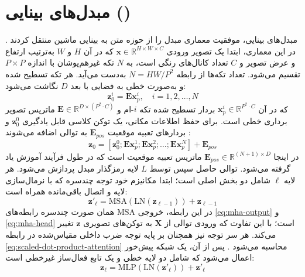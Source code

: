 \section[مبدل‌های بینایی]{مبدل‌های بینایی ()}
\label{sec:ch1-vit}
مبدل‌های بینایی، موفقیت معماری مبدل را از حوزه متن به بینایی ماشین منتقل کردند \cite{Dosovitskiy2020}.
در این معماری، ابتدا یک تصویر ورودی $\mathbf{x} \in \mathbb{R}^{H \times W \times C}$ که در آن $H$ و $W$ به‌ترتیب ارتفاع و عرض تصویر و $C$ تعداد کانال‌های رنگی است، به $N$ تکه غیرهم‌پوشان با اندازه $P \times P$ تقسیم می‌شود. تعداد تکه‌ها از رابطه $N = HW/P^2$ به‌دست می‌آید. هر تکه تسطیح شده و به‌صورت خطی به فضایی با بعد $D$ نگاشت می‌شود:
\begin{equation}
    \mathbf{z}_0^i = \mathbf{E} \mathbf{x}_p^i, \quad i = 1, 2, \dots, N
\end{equation}
که در آن $\mathbf{x}_p^i \in \mathbb{R}^{P^2 \cdot C}$ بردار تسطیح شده تکه $i$-ام و $\mathbf{E} \in \mathbb{R}^{D \times (P^2 \cdot C)}$ ماتریس تصویر برداری خطی است. برای حفظ اطلاعات مکانی، یک توکن کلاسی قابل یادگیری $\mathbf{z}_0^0$ و بردارهای تعبیه موقعیت $\mathbf{E}_{pos}$ به توالی اضافه می‌شوند \cite{Dosovitskiy2020}:
\begin{equation}
    \mathbf{z}_0 = [\mathbf{z}_0^0; \mathbf{E}\mathbf{x}_p^1; \mathbf{E}\mathbf{x}_p^2; \dots; \mathbf{E}\mathbf{x}_p^N] + \mathbf{E}_{pos}
\end{equation}
در اینجا $\mathbf{E}_{pos} \in \mathbb{R}^{(N+1) \times D}$ ماتریس تعبیه موقعیت است که در طول فرآیند آموزش یاد گرفته می‌شود. توالی حاصل سپس توسط $L$ لایه رمزگذار مبدل پردازش می‌شود. هر لایه $\ell$ شامل دو بخش اصلی است؛ ابتدا مکانیزم خود توجه چندسره که با نرمال‌سازی لایه و اتصال باقی‌مانده همراه است:
\begin{equation}
    \mathbf{z}'_\ell = \text{MSA}(\text{LN}(\mathbf{z}_{\ell-1})) + \mathbf{z}_{\ell-1}
\end{equation}
در این رابطه، خروجی $\text{MSA}$ همان صورت چندسره رابطه‌های \ref{eq:mha-output} و \ref{eq:mha-head} است؛ با این تفاوت که ورودی توالی از $\mathbf{X}$ به توکن‌های تصویری $\mathbf{z}$ تغییر می‌کند. هر سر توجه نیز همچنان بر پایه توجه ضرب داخلی مقیاس‌شده در رابطه \ref{eq:scaled-dot-product-attention} محاسبه می‌شود \cite{Dosovitskiy2020,Vaswani2017}.
پس از آن، یک شبکه پیش‌خور اعمال می‌شود که شامل دو لایه خطی و یک تابع فعال‌ساز غیرخطی  است:
\begin{equation}
    \mathbf{z}_\ell = \text{MLP}(\text{LN}(\mathbf{z}'_\ell)) + \mathbf{z}'_\ell
\end{equation}
